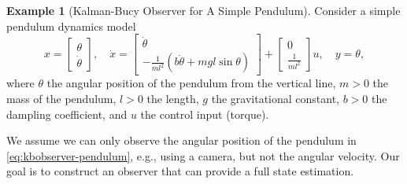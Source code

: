 \documentclass[
]{book}
\theoremstyle{definition}
\theoremstyle{definition}
\newtheorem{example}{Example}[chapter]
\theoremstyle{definition}
\theoremstyle{definition}
\theoremstyle{remark}
\begin{document}
\begin{example}[Kalman-Bucy Observer for A Simple Pendulum]
\protect\hypertarget{exm:pendulumkbobserver}{}\label{exm:pendulumkbobserver}Consider a simple pendulum dynamics model
\begin{equation}
x = \begin{bmatrix}
\theta \\ \dot{\theta}
\end{bmatrix}, \quad 
\dot{x} = \begin{bmatrix} 
\dot{\theta} \\
- \frac{1}{ml^2} (b \dot{\theta} + mgl \sin \theta) 
\end{bmatrix} + 
\begin{bmatrix}
0 \\
\frac{1}{ml^2} 
\end{bmatrix} u, \quad y = \theta,
\label{eq:kbobserver-pendulum}
\end{equation}
where \(\theta\) the angular position of the pendulum from the vertical line, \(m > 0\) the mass of the pendulum, \(l > 0\) the length, \(g\) the gravitational constant, \(b > 0\) the dampling coefficient, and \(u\) the control input (torque).

We assume we can only observe the angular position of the pendulum in \eqref{eq:kbobserver-pendulum}, e.g., using a camera, but not the angular velocity. Our goal is to construct an observer that can provide a full state estimation.


\end{example}
\end{document}
